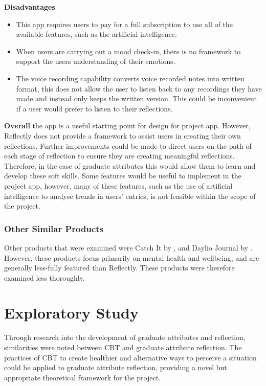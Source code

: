 \documentclass{l4proj}
\begin{document}
\textbf{Disadvantages}
\begin{itemize}
    \item This app requires users to pay for a full subscription to use all of the available features, such as the artificial intelligence. 
    \item When users are carrying out a mood check-in, there is no framework to support the users understanding of their emotions.
    \item The voice recording capability converts voice recorded notes into written format, this does not allow the user to listen back to any recordings they have made and instead only keeps the written version. This could be inconvenient if a user would prefer to listen to their reflections.
\end{itemize}

\textbf{Overall} the app is a useful starting point for design for project app. However, Reflectly does not provide a framework to assist users in creating their own reflections. Further improvements could be made to direct users on the path of each stage of reflection to ensure they are creating meaningful reflections. Therefore, in the case of graduate attributes this would allow them to learn and develop these soft skills. Some features would be useful to implement in the project app, however, many of these features, such as the use of artificial intelligence to analyse trends in users’ entries, is not feasible within the scope of the project.

\subsection{Other Similar Products}

Other products that were examined were Catch It by \citet{nhsDigital_catch_2021}, and Daylio Journal by \citet{relaxio_src_daylio_2021}. However, these products focus primarily on mental health and wellbeing, and are generally less-fully featured than Reflectly. These products were therefore examined less thoroughly.

\chapter{Exploratory Study} \label{ExploratoryStudy}

Through research into the development of graduate attributes and reflection, similarities were noted between CBT and graduate attribute reflection. The practices of CBT to create healthier and alternative ways to perceive a situation could be applied to graduate attribute reflection, providing a novel but appropriate theoretical framework for the project.
\end{document}
